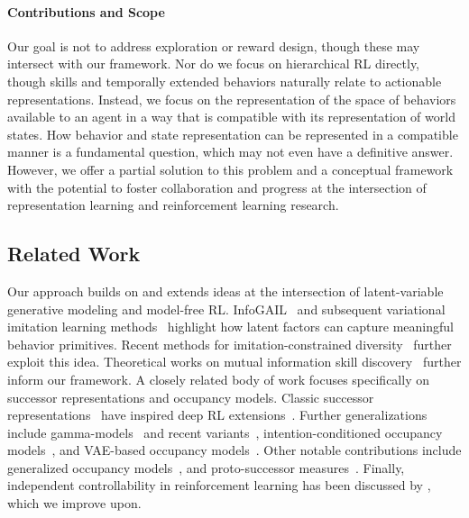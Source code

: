 \documentclass{article}
\theoremstyle{plain}
\theoremstyle{definition}
\theoremstyle{remark}
\begin{document}
\paragraph{Contributions and Scope} Our goal is not to address exploration or reward design, though these may intersect with our framework. Nor do we focus on hierarchical RL directly, though skills and temporally extended behaviors naturally relate to actionable representations.
Instead, we focus on the representation of the space of behaviors available to an agent in a way that is compatible with its representation of world states.
How behavior and state representation can be represented in a compatible manner is a fundamental question, which may not even have a definitive answer. However, we offer a partial solution to this problem and a conceptual framework with the potential to foster collaboration and progress at the intersection of representation learning and reinforcement learning research.

\subsection{Related Work}

Our approach builds on and extends ideas at the intersection of latent-variable generative modeling and model-free RL. InfoGAIL~\citep{li2017infogail} and subsequent variational imitation learning methods~\citep{rafailov2021visual} highlight how latent factors can capture meaningful behavior primitives. Recent methods for imitation-constrained diversity~\citep{sun2024prompt, kolev2025dual} further exploit this idea. Theoretical works on mutual information skill discovery~\citep{eysenbach2022the, yang2025task} further inform our framework.
A closely related body of work focuses specifically on successor representations and occupancy models. Classic successor representations~\citep{dayan1993improving} have inspired deep RL extensions~\citep{barreto2017successor, touati2021learning}. 
Further generalizations include gamma-models~\citep{janner2020gamma} and recent variants~\citep{farebrother2025temporal}, intention-conditioned occupancy models~\citep{zheng2025intentionconditionedflowoccupancymodels}, and VAE-based occupancy models~\citep{thakoor2022generalisedpolicyimprovementgeometric, tomar2024videooccupancymodels}. Other notable contributions include generalized occupancy models~\citep{zhu2024transferable}, and proto-successor measures~\citep{agarwal2025proto}.
Finally, independent controllability in reinforcement learning has been discussed by \citep{thomas2017independently, grimm2020disentangled}, which we improve upon.
\end{document}
